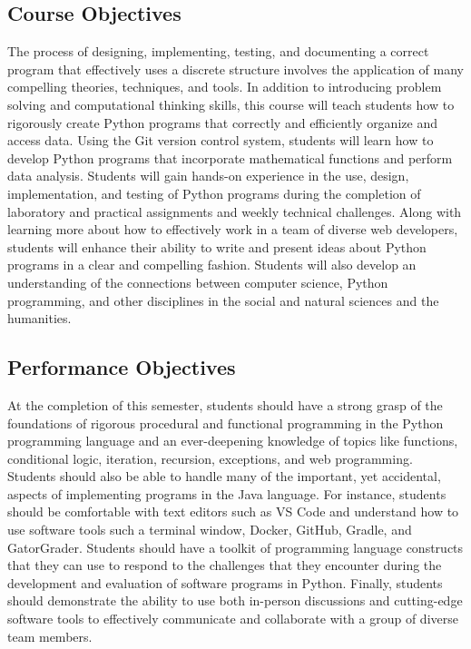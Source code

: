 \documentclass[11pt]{article}
\begin{document}
\subsection*{Course Objectives}

The process of designing, implementing, testing, and documenting a correct
program that effectively uses a discrete structure involves the application of
many compelling theories, techniques, and tools. In addition to introducing
problem solving and computational thinking skills, this course will teach
students how to rigorously create Python programs that correctly and
efficiently organize and access data. Using the Git version control system,
students will learn how to develop Python programs that incorporate
mathematical functions and perform data analysis.
%
Students will gain hands-on experience in the use, design, implementation, and
testing of Python programs during the completion of laboratory and practical
assignments and weekly technical challenges. Along with learning more about how
to effectively work in a team of diverse web developers, students will enhance
their ability to write and present ideas about Python programs in a clear and
compelling fashion. Students will also develop an understanding of the
connections between computer science, Python programming, and other disciplines
in the social and natural sciences and the humanities.

\subsection*{Performance Objectives}

At the completion of this semester, students should have a strong grasp of the
foundations of rigorous procedural and functional programming in the Python
programming language and an ever-deepening knowledge of topics like functions,
conditional logic, iteration, recursion, exceptions, and web programming.
Students should also be able to handle many of the important, yet accidental,
aspects of implementing programs in the Java language. For instance, students
should be comfortable with text editors such as VS Code and understand how to
use software tools such a terminal window, Docker, GitHub, Gradle, and
GatorGrader. Students should have a toolkit of programming language constructs
that they can use to respond to the challenges that they encounter during the
development and evaluation of software programs in Python. Finally, students
should demonstrate the ability to use both in-person discussions and
cutting-edge software tools to effectively communicate and collaborate with a
group of diverse team members.
\end{document}
